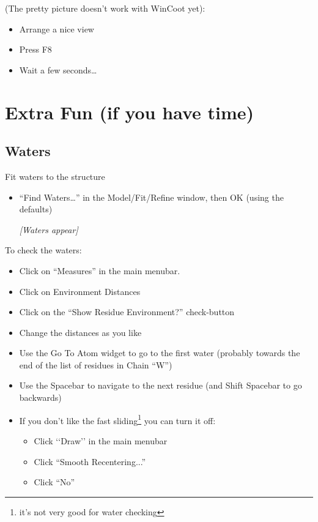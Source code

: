 \documentclass{article}
\begin{document}
(The pretty picture doesn't work with WinCoot yet):

\begin{itemize}
\item Arrange a nice view
\item Press F8
\item Wait a few seconds\ldots
\end{itemize}


\section{Extra Fun (if you have time)}

\subsection{Waters}
Fit waters to the structure
\begin{itemize}
\item \textsf{``Find Waters\ldots''} in the Model/Fit/Refine window,
  then OK (using the defaults)

\textsl{ [Waters appear]}

\end{itemize}
To check the waters:
\begin{itemize}
\item Click on \textsf{``Measures''} in the main menubar.  
\item Click on \textsf{Environment Distances}
\item Click on the \textsf{``Show Residue Environment?''} check-button
\item Change the distances as you like
\item Use the Go To Atom widget to go to the first water (probably
  towards the end of the list of residues in Chain ``W'')
\item Use the Spacebar to navigate to the next residue (and Shift
  Spacebar to go backwards)
\item If you don't like the fast sliding\footnote{it's not very good
    for water checking} you can turn it off:
  \begin{itemize}
  \item Click `\textsf{`Draw''} in the main menubar
  \item Click \textsf{``Smooth Recentering...''}
  \item Click \textsf{``No''}
  \end{itemize}
\end{itemize}
\end{document}

